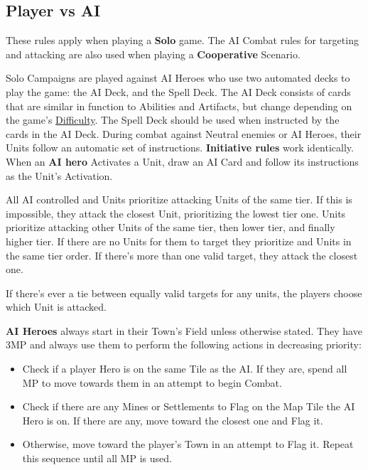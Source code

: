 \begin{multicols}{2}
\subsection*{\hypertarget{AIrules}{Player vs AI}}
These rules apply when playing a \textbf{Solo} game.
The AI Combat rules for targeting and attacking are also used when playing a \textbf{Cooperative} Scenario.\par
Solo Campaigns are played against AI Heroes who use two automated decks to play the game: the AI Deck, and the Spell Deck.
The AI Deck consists of cards that are similar in function to Abilities and Artifacts, but change depending on the game's \hyperlink{Difficulty}{Difficulty}.
The Spell Deck should be used when instructed by the cards in the AI Deck.
During combat against Neutral enemies or AI Heroes, their Units follow an automatic set of instructions.
\textbf{Initiative rules} work identically.
When an \textbf{AI hero} Activates a Unit, draw an AI Card and follow its instructions as the Unit's Activation.\par
All AI controlled  and  Units prioritize attacking Units of the same tier.
If this is impossible, they attack the closest Unit, prioritizing the lowest tier one.
 Units prioritize attacking other  Units of the same tier, then lower tier, and finally higher tier.
If there are no  Units for them to target they prioritize  and  Units in the same tier order.
If there's more than one valid target, they attack the closest one.\par
If there's ever a tie between equally valid targets for any units, the players choose which Unit is attacked.

\textbf{AI Heroes} always start in their Town's Field unless otherwise stated.
They have 3MP and always use them to perform the following actions in decreasing priority:
\begin{itemize}
  \item Check if a player Hero is on the same Tile as the AI.
    If they are, spend all MP to move towards them in an attempt to begin Combat.
  \item Check if there are any Mines or Settlements to Flag on the Map Tile the AI Hero is on.
    If there are any, move toward the closest one and Flag it.
  \item Otherwise, move toward the player's Town in an attempt to Flag it.
Repeat this sequence until all MP is used.
\end{itemize}


\end{multicols}
